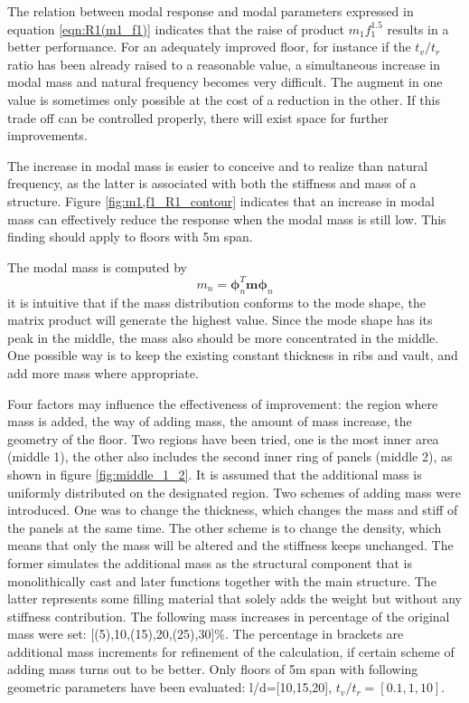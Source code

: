 The relation between modal response and modal parameters expressed in equation \ref{eqn:R1(m1_f1)} indicates that the raise of product $m_1f_1^{1.5}$ results in a better performance. For an adequately improved floor, for instance if the $t_v/t_r$ ratio has been already raised to a reasonable value, a simultaneous increase in modal mass and natural frequency becomes very difficult. The augment in one value is sometimes only possible at the cost of a reduction in the other. If this trade off can be controlled properly, there will exist space for further improvements. 

The increase in modal mass is easier to conceive and to realize than natural frequency, as the latter is associated with both the stiffness and mass of a structure. Figure \ref{fig:m1,f1_R1_contour} indicates that an increase in modal mass can effectively reduce the response when the modal mass is still low. This finding should apply to floors with 5m span.

The modal mass is computed by
\begin{equation}
\label{eqn:mn_1}
    m_n = \boldsymbol{\phi}_n^T\textbf{m}\boldsymbol{\phi}_n
\end{equation}
it is intuitive that if the mass distribution conforms to the mode shape, the matrix product will generate the highest value. Since the mode shape has its peak in the middle, the mass also should be more concentrated in the middle. One possible way is to keep the existing constant thickness in ribs and vault, and add more mass where appropriate. 

Four factors may influence the effectiveness of improvement: the region where mass is added, the way of adding mass, the amount of mass increase, the geometry of the floor. Two regions have been tried, one is the most inner area (middle 1), the other also includes the second inner ring of panels (middle 2), as shown in figure \ref{fig:middle_1_2}. It is assumed that the additional mass is uniformly distributed on the designated region. Two schemes of adding mass were introduced. One was to change the thickness, which changes the mass and stiff of the panels at the same time. The other scheme is to change the density, which means that only the mass will be altered and the stiffness keeps unchanged. The former simulates the additional mass as the structural component that is monolithically cast and later functions together with the main structure. The latter represents some filling material that solely adds the weight but without any stiffness contribution. The following mass increases in percentage of the original mass were set: [(5),10,(15),20,(25),30]\%. The percentage in brackets are additional mass increments for refinement of the calculation, if certain scheme of adding mass turns out to be better. Only floors of 5m span with following geometric parameters have been evaluated: l/d=[10,15,20], $t_v/t_r=[0.1,1,10]$.

